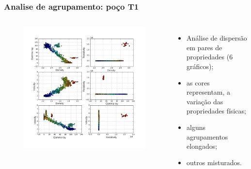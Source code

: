 \documentclass[aspectratio=10]{beamer} %
\begin{document}
\begin{frame}
	\frametitle{Analise de agrupamento: poço T1}
	\begin{columns}
		\footnotesize
		\justifying
		\begin{figure}
			\includegraphics[scale=0.268]{Imagens/cluterpocoT1.png}
		\end{figure}
		
		\begin{itemize}
			\footnotesize
			\item Análise de dispersão em pares de propriedades ($6$ gráficos);
			\pause
			\item as cores representam, a variação das propriedades físicas;
			\pause
			\item alguns agrupamentos elongados;
			\pause
			\item outros misturados.
		\end{itemize}
		
	\end{columns}
\end{frame}
\end{document}
